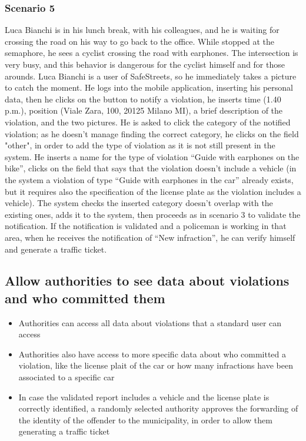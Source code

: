 \subsubsection{Scenario 5}
Luca Bianchi is in his lunch break, with his colleagues, and he is waiting for crossing the road on his way to go back to the office. While stopped at the semaphore, he sees a cyclist crossing the road with earphones. The intersection is very busy, and this behavior is dangerous for the cyclist himself and for those arounds. Luca Bianchi is a user of SafeStreets, so he immediately takes a picture to catch the moment. He logs into the mobile application, inserting his personal data, then he clicks on the button to notify a violation, he inserts time (1.40 p.m.), position (Viale Zara, 100, 20125 Milano MI), a brief description of the violation, and the two pictures. He is asked to click the category of the notified violation; as he doesn’t manage finding the correct category, he clicks on the field "other", in order to add the type of violation as it is not still present in the system. He inserts a name for the type of violation “Guide with earphones on the bike”, clicks on the field that says that the violation doesn’t include a vehicle (in the system a violation of type “Guide with earphones in the car” already exists, but it requires also the specification of the license plate as the violation includes a vehicle). The system checks the inserted category doesn’t overlap with the existing ones, adds it to the system, then proceeds as in scenario 3 to validate the notification. If the notification is validated and a policeman is working in that area, when he receives the notification of “New infraction”, he can verify himself and generate a traffic ticket.

\subsection{Allow authorities to see data about violations and who committed them}
\begin{itemize}
    \item Authorities can access all data about violations that a standard user can access
    \item Authorities also have access to more specific data about who committed a violation, like the license plait of the car or how many infractions have been associated to a specific car
    \item In case the validated report includes a vehicle and the license plate is correctly identified, a randomly selected authority approves the forwarding of the identity of the offender to the municipality, in order to allow them generating a traffic ticket
\end{itemize}
